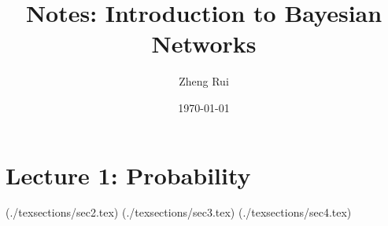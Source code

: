 \documentclass[12pt, a4paper]{article}
\title{\textbf{Notes: Introduction to Bayesian Networks}}
\author{Zheng Rui}
\date{\today}
\begin{document}
\maketitle

\section*{Lecture 1: Probability}

(./texsections/sec2.tex)
(./texsections/sec3.tex)
(./texsections/sec4.tex)
\end{document}
